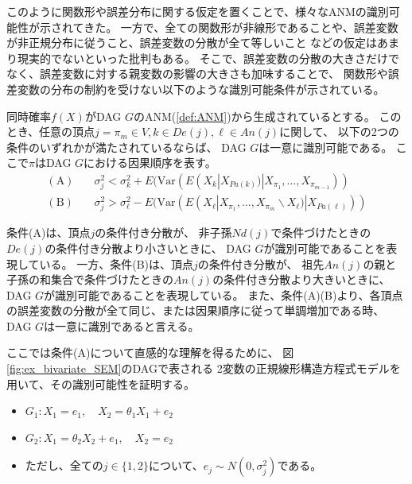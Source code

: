 このように関数形や誤差分布に関する仮定を置くことで、様々なANMの識別可能性が示されてきた。
一方で、全ての関数形が非線形であることや、誤差変数が非正規分布に従うこと、誤差変数の分散が全て等しいこと
などの仮定はあまり現実的でないといった批判もある。
そこで、誤差変数の分散の大きさだけでなく、誤差変数に対する親変数の影響の大きさも加味することで、
関数形や誤差変数の分布の制約を受けない以下のような識別可能条件が示されている\cite{Park2020-ey}。

\begin{theo}
  同時確率$f(X)$がDAG $G$のANM(\ref{def:ANM})から生成されているとする。
  このとき、任意の頂点$j = \pi_m \in V, k \in De(j), \ell \in An(j)$に関して、
  以下の2つの条件のいずれかが満たされているならば、
  DAG $G$は一意に識別可能である。
  ここで$\pi$はDAG $G$における因果順序を表す。
  \begin{align*}
    (\text{A}) \quad &\sigma_j^2 < \sigma_k^2 + E(\mathrm{Var}(E(X_k | X_{Pa(k)}) | X_{\pi_1}, \dots, X_{\pi_{m-1}})) \\
    (\text{B}) \quad &\sigma_j^2 > \sigma_{\ell}^2 - E(\mathrm{Var}(E(X_{\ell} | X_{\pi_1}, \dots, X_{\pi_m} \backslash X_{\ell}) | X_{Pa(\ell)}))
  \end{align*}
\end{theo}

条件(A)は、頂点$j$の条件付き分散が、
非子孫$\mathit{Nd}(j)$で条件づけたときの$De(j)$の条件付き分散より小さいときに、
DAG $G$が識別可能であることを表現している。
一方、条件(B)は、頂点$j$の条件付き分散が、
祖先$An(j)$の親と子孫の和集合で条件づけたときの$An(j)$の条件付き分散より大きいときに、
DAG $G$が識別可能であることを表現している。
また、条件(A)(B)より、各頂点の誤差変数の分散が全て同じ、または因果順序に従って単調増加である時、
DAG $G$は一意に識別であると言える。

ここでは条件(A)について直感的な理解を得るために、
図\ref{fig:ex_bivariate_SEM}のDAGで表される
2変数の正規線形構造方程式モデルを用いて、その識別可能性を証明する。

\begin{itemize}
  \item
  $G_1 \colon X_1 = e_1,
   \quad X_2 = \theta_1 X_1 + e_2$

  \item
  $G_2 \colon X_1 = \theta_2 X_2 + e_1,
   \quad X_2 = e_2$

  \item
  ただし、全ての$j \in \{ 1,2 \}$について、$e_j \sim N(0, \sigma_j^2)$である。
\end{itemize}

